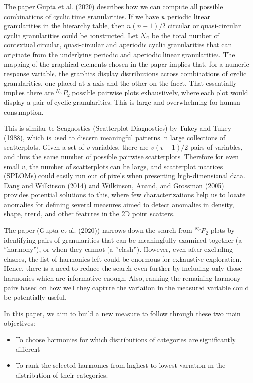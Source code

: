 \documentclass[
]{article}
\providecommand{\tightlist}{%
  \setlength{\itemsep}{0pt}\setlength{\parskip}{0pt}}
\begin{document}
The paper Gupta et al. (2020) describes how we can compute all possible combinations of cyclic time granularities. If we have \(n\) periodic linear granularities in the hierarchy table, then \(n(n-1)/2\) circular or quasi-circular cyclic granularities could be constructed. Let \(N_C\) be the total number of contextual circular, quasi-circular and aperiodic cyclic granularities that can originate from the underlying periodic and aperiodic linear granularities. The mapping of the graphical elements chosen in the paper implies that, for a numeric response variable, the graphics display distributions across combinations of cyclic granularities, one placed at x-axis and the other on the facet. That essentially implies there are \(^{N_C}P_2\) possible pairwise plots exhaustively, where each plot would display a pair of cyclic granularities. This is large and overwhelming for human consumption.

This is similar to Scagnostics (Scatterplot Diagnostics) by Tukey and Tukey (1988), which is used to discern meaningful patterns in large collections of scatterplots. Given a set of \(v\) variables, there are \(v(v-1)/2\) pairs of variables, and thus the same number of possible pairwise scatterplots. Therefore
for even small \(v\), the number of scatterplots can be
large, and scatterplot matrices (SPLOMs) could easily run out of pixels when presenting high-dimensional data. Dang and Wilkinson (2014) and Wilkinson, Anand, and Grossman (2005) provides potential solutions to this, where few characterizations help us to locate anomalies for defining several measures aimed to detect anomalies in density, shape, trend, and
other features in the 2D point scatters.

The paper (Gupta et al. (2020)) narrows down the search from \(^{N_C}P_2\) plots by identifying pairs of granularities that can be meaningfully examined together (a ``harmony''), or when they cannot (a ``clash''). However, even after excluding clashes, the list of harmonies left could be enormous for exhaustive exploration. Hence, there is a need to reduce the search even further by including only those harmonies which are informative enough. Also, ranking the remaining harmony pairs based on how well they capture the variation in the measured variable could be potentially useful.

In this paper, we aim to build a new measure to follow through these two main objectives:

\begin{itemize}
\tightlist
\item
  To choose harmonies for which distributions of categories are significantly different
\item
  To rank the selected harmonies from highest to lowest variation in the distribution of their categories.
\end{itemize}
\end{document}
